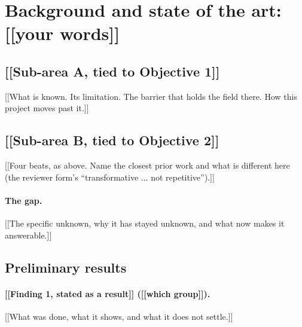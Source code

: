 \documentclass[12pt,a4paper]{article}
\begin{document}
\section{Background and state of the art: [[your words]]}

\subsection{[[Sub-area A, tied to Objective 1]]}
[[What is known. Its limitation. The barrier that holds the field there. How this project
moves past it.]]

\subsection{[[Sub-area B, tied to Objective 2]]}
[[Four beats, as above. Name the closest prior work and what is different here
(the reviewer form's ``transformative ... not repetitive'').]]

\paragraph{The gap.} [[The specific unknown, why it has stayed unknown, and what now makes it
answerable.]]

\subsection{Preliminary results}

\paragraph{[[Finding 1, stated as a result]] ([[which group]]).}
[[What was done, what it shows, and what it does not settle.]]
\end{document}
